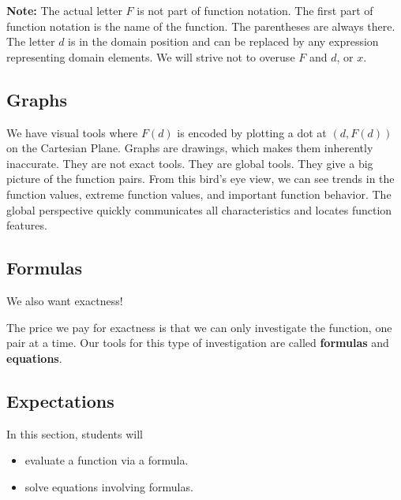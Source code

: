\documentclass{ximera}
\begin{document}
\textbf{Note:}  The actual letter $F$ is not part of function notation.  The first part of function notation is the name of the function. The parentheses are always there.  The letter $d$ is in the domain position and can be replaced by any expression representing domain elements.  We will strive not to overuse $F$ and $d$, or $x$.










\subsection{Graphs}

We have visual tools where $F(d)$ is encoded by plotting a dot at $(d, F(d))$ on the Cartesian Plane.  Graphs are drawings, which makes them inherently inaccurate.  They are not exact tools.  They are global tools.  They give a big picture of the function pairs.  From this bird's eye view, we can see trends in the function values, extreme function values, and important function behavior. The global perspective quickly communicates all characteristics and locates function features.












\subsection{Formulas}
We also want exactness!

The price we pay for exactness is that we can only investigate the function, one pair at a time.  Our tools for this type of investigation are called \textbf{formulas} and \textbf{equations}.








\subsection{Expectations}

\begin{sectionOutcomes}
In this section, students will 

\begin{itemize}
\item evaluate a function via a formula.
\item solve equations involving formulas.
\end{itemize}
\end{sectionOutcomes}
\end{document}
